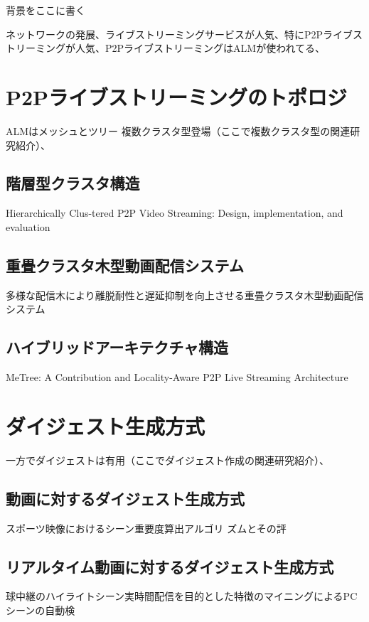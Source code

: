 背景をここに書く

ネットワークの発展、ライブストリーミングサービスが人気、特にP2Pライブストリーミングが人気、P2PライブストリーミングはALMが使われてる、

\section{P2Pライブストリーミングのトポロジ}
ALMはメッシュとツリー
複数クラスタ型登場（ここで複数クラスタ型の関連研究紹介）、

\subsection{階層型クラスタ構造}

Hierarchically Clus-tered P2P Video Streaming: Design, implementation, and evaluation

\subsection{重畳クラスタ木型動画配信システム}

多様な配信木により離脱耐性と遅延抑制を向上させる重畳クラスタ木型動画配信システム

\subsection{ハイブリッドアーキテクチャ構造}

MeTree: A Contribution and Locality-Aware P2P Live Streaming Architecture

\section{ダイジェスト生成方式}
一方でダイジェストは有用（ここでダイジェスト作成の関連研究紹介）、

\subsection{動画に対するダイジェスト生成方式}

スポーツ映像におけるシーン重要度算出アルゴリ
ズムとその評

\subsection{リアルタイム動画に対するダイジェスト生成方式}

球中継のハイライトシーン実時間配信を目的とした特徴のマイニングによるPCシーンの自動検


